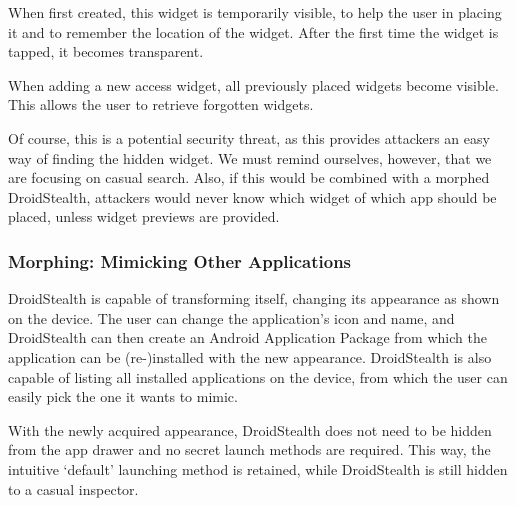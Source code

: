 When first created, this widget is temporarily visible, to help the user in placing it and to remember the location of the widget.
After the first time the widget is tapped, it becomes transparent.

When adding a new access widget, all previously placed widgets become visible. 
This allows the user to retrieve forgotten widgets. 

Of course, this is a potential security threat, as this provides attackers an easy way of finding the hidden widget. 
We must remind ourselves, however, that we are focusing on casual search. 
Also, if this would be combined with a morphed DroidStealth, attackers would never know which widget of which app should be placed, unless widget previews are provided.

\subsubsection{Morphing: Mimicking Other Applications}
DroidStealth is capable of transforming itself, changing its appearance as shown on the device.
The user can change the application's icon and name, and DroidStealth can then create an Android Application Package from which the application can be (re-)installed with the new appearance.
DroidStealth is also capable of listing all installed applications on the device, from which the user can easily pick the one it wants to mimic.

With the newly acquired appearance, DroidStealth does not need to be hidden from the app drawer and no secret launch methods are required.
This way, the intuitive `default' launching method is retained, while DroidStealth is still hidden to a casual inspector.
